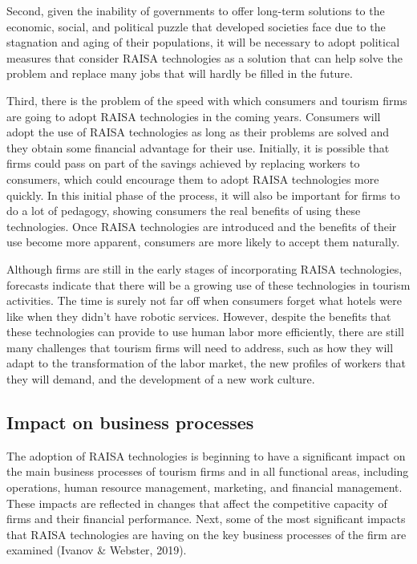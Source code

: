 \documentclass[
  letterpaper,
  DIV=11,
  numbers=noendperiod]{scrreprt}
\begin{document}
Second, given the inability of governments to offer long-term solutions
to the economic, social, and political puzzle that developed societies
face due to the stagnation and aging of their populations, it will be
necessary to adopt political measures that consider RAISA technologies
as a solution that can help solve the problem and replace many jobs that
will hardly be filled in the future.

Third, there is the problem of the speed with which consumers and
tourism firms are going to adopt RAISA technologies in the coming years.
Consumers will adopt the use of RAISA technologies as long as their
problems are solved and they obtain some financial advantage for their
use. Initially, it is possible that firms could pass on part of the
savings achieved by replacing workers to consumers, which could
encourage them to adopt RAISA technologies more quickly. In this initial
phase of the process, it will also be important for firms to do a lot of
pedagogy, showing consumers the real benefits of using these
technologies. Once RAISA technologies are introduced and the benefits of
their use become more apparent, consumers are more likely to accept them
naturally.

Although firms are still in the early stages of incorporating RAISA
technologies, forecasts indicate that there will be a growing use of
these technologies in tourism activities. The time is surely not far off
when consumers forget what hotels were like when they didn't have
robotic services. However, despite the benefits that these technologies
can provide to use human labor more efficiently, there are still many
challenges that tourism firms will need to address, such as how they
will adapt to the transformation of the labor market, the new profiles
of workers that they will demand, and the development of a new work
culture.

\hypertarget{impact-on-business-processes}{%
\subsection{Impact on business
processes}\label{impact-on-business-processes}}

The adoption of RAISA technologies is beginning to have a significant
impact on the main business processes of tourism firms and in all
functional areas, including operations, human resource management,
marketing, and financial management. These impacts are reflected in
changes that affect the competitive capacity of firms and their
financial performance. Next, some of the most significant impacts that
RAISA technologies are having on the key business processes of the firm
are examined (Ivanov \& Webster, 2019).
\end{document}
